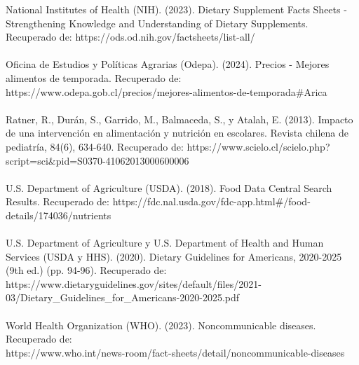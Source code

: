 \documentclass[letterpaper]{article}
\begin{document}
National Institutes of Health (NIH). (2023). Dietary Supplement Facts Sheets - Strengthening Knowledge and Understanding of Dietary Supplements. Recuperado de: https://ods.od.nih.gov/factsheets/list-all/
\\
\\

Oficina de Estudios y Políticas Agrarias (Odepa). (2024). Precios - Mejores alimentos de temporada. Recuperado de: https://www.odepa.gob.cl/precios/mejores-alimentos-de-temporada#Arica
\\
\\

Ratner, R., Durán, S., Garrido, M., Balmaceda, S., y Atalah, E. (2013). Impacto de una intervención en alimentación y nutrición en escolares. Revista chilena de pediatría, 84(6), 634-640. Recuperado de: https://www.scielo.cl/scielo.php?script=sci\&pid=S0370-41062013000600006 
\\
\\

U.S. Department of Agriculture (USDA). (2018). Food Data Central Search Results. Recuperado de: https://fdc.nal.usda.gov/fdc-app.html#/food-details/174036/nutrients
\\
\\

U.S. Department of Agriculture y U.S. Department of Health and Human Services (USDA y HHS). (2020). Dietary Guidelines for Americans, 2020-2025 (9th ed.) (pp. 94-96).  Recuperado de: https://www.dietaryguidelines.gov/sites/default/files/2021-03/Dietary_Guidelines_for_Americans-2020-2025.pdf
\\
\\

World Health Organization (WHO). (2023). Noncommunicable diseases. Recuperado de:\\ https://www.who.int/news-room/fact-sheets/detail/noncommunicable-diseases


    
\end{document}
